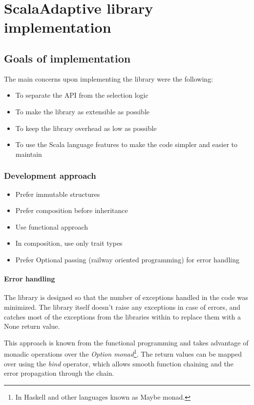 \chapter{ScalaAdaptive library implementation}
\label{chap:implementation}

\section{Goals of implementation}

The main concerns upon implementing the library were the following:

\begin{itemize}
	\item To separate the API from the selection logic
	\item To make the library as extensible as possible
	\item To keep the library overhead as low as possible
	\item To use the Scala language features to make the code simpler and easier to maintain
\end{itemize}

\subsection{Development approach}

\begin{itemize}
	\item Prefer immutable structures
	\item Prefer composition before inheritance
	\item Use functional approach
	\item In composition, use only trait types
	\item Prefer Optional passing (railway oriented programming) for error handling
\end{itemize}

\subsubsection{Error handling}

The library is designed so that the number of exceptions handled in the code was minimized. The library itself doesn't raise any exceptions in case of errors, and catches most of the exceptions from the libraries within to replace them with a None return value.

This approach is known from the functional programming and takes advantage of monadic operations over the \textit{Option monad}\footnote{In Haskell and other languages known as Maybe monad.}. The return values can be mapped over using the \textit{bind} operator, which allows smooth function chaining and the error propagation through the chain.

